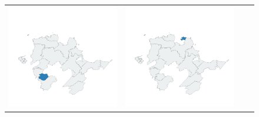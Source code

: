 \begin{figure}
\begin{tabularx}{1\textwidth}{XXXX}
\includegraphics[width=1\linewidth]{images/ch6/loading/13}&
\includegraphics[width=1\linewidth]{images/ch6/loading/14}&

\end{tabularx}
\end{figure}
